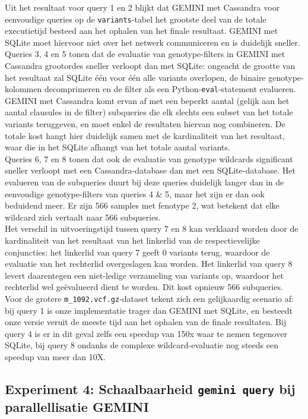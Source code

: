Uit het resultaat voor query 1 en 2 blijkt dat GEMINI met Cassandra voor eenvoudige queries op de \texttt{variants}-tabel het grootste deel van de totale executietijd besteed aan het ophalen van het finale resultaat. GEMINI met SQLite moet hiervoor niet over het netwerk communiceren en is duidelijk sneller.\\
Queries 3, 4 en 5 tonen dat de evaluatie van genotype-filters in GEMINI met Cassandra grootordes sneller verloopt dan met SQLite: ongeacht de grootte van het resultaat zal SQLite \'e\'en voor \'e\'en alle variants overlopen, de binaire genotype-kolommen decomprimeren en de filter als een Python-\texttt{eval}-statement evalueren. GEMINI met Cassandra komt ervan af met een beperkt aantal (gelijk aan het aantal clausules in de filter) subqueries die elk slechts een subset van het totale variants teruggeven, en moet enkel de resultaten hiervan nog combineren. De totale kost hangt hier duidelijk samen met de kardinaliteit van het resultaat, waar die in het SQLite afhangt van het totale aantal variants.\\
Queries 6, 7 en 8 tonen dat ook de evaluatie van genotype wildcards significant sneller verloopt met een Cassandra-database dan met een SQLite-database. Het evalueren van de subqueries duurt bij deze queries duidelijk langer dan in de eenvoudige genotype-filters van queries 4 \& 5, maar het zijn er dan ook beduidend meer. Er zijn 566 samples met fenotype 2, wat betekent dat elke wildcard zich vertaalt naar 566 subqueries. \\
Het verschil in uitvoeringstijd tussen query 7 en 8 kan verklaard worden door de kardinaliteit van het resultaat van het linkerlid van de respectievelijke conjuncties: het linkerlid van query 7 geeft 0 variants terug, waardoor de evaluatie van het rechterlid overgeslagen kan worden. Het linkerlid van query 8 levert daarentegen een niet-ledige verzameling van variants op, waardoor het rechterlid wel ge\"evalueerd dient te worden. Dit kost opnieuw 566 subqueries.\\

Voor de grotere \texttt{m\_1092.vcf.gz}-dataset tekent zich een gelijkaardig scenario af: bij query 1 is onze implementatie trager dan GEMINI met SQLite, en besteedt onze versie veruit de meeste tijd aan het ophalen van de finale resultaten. Bij query 4 is er in dit geval zelfs een speedup van 150x waar te nemen tegenover SQLite, bij query 8 ondanks de complexe wildcard-evaluatie nog steeds een speedup van meer dan 10X. 

\subsection{Experiment 4: Schaalbaarheid \texttt{gemini query} bij parallellisatie GEMINI}
\label{exp4}

